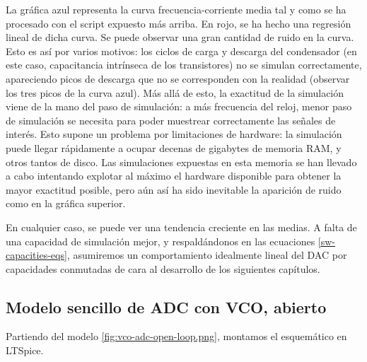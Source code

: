\documentclass[12pt]{report} %
\begin{document}
	La gráfica azul representa la curva frecuencia-corriente media tal y como se ha procesado con el script expuesto más arriba. En rojo, se ha hecho una regresión lineal de dicha curva. Se puede observar una gran cantidad de ruido en la curva. Esto es así por varios motivos: los ciclos de carga y descarga del condensador (en este caso, capacitancia intrínseca de los transistores) no se simulan correctamente, apareciendo picos de descarga que no se corresponden con la realidad (observar los tres picos de la curva azul). Más allá de esto, la exactitud de la simulación viene de la mano del paso de simulación: a más frecuencia del reloj, menor paso de simulación se necesita para poder muestrear correctamente las señales de interés. Esto supone un problema por limitaciones de hardware: la simulación puede llegar rápidamente a ocupar decenas de gigabytes de memoria RAM, y otros tantos de disco. Las simulaciones expuestas en esta memoria se han llevado a cabo intentando explotar al máximo el hardware disponible para obtener la mayor exactitud posible, pero aún así ha sido inevitable la aparición de ruido como en la gráfica superior.
	
	En cualquier caso, se puede ver una tendencia creciente en las medias. A falta de una capacidad de simulación mejor, y respaldándonos en las ecuaciones \ref{sw-capacities-eqs}, asumiremos un comportamiento idealmente lineal del DAC por capacidades conmutadas de cara al desarrollo de los siguientes capítulos.
	
	\subsection{Modelo sencillo de ADC con VCO, abierto}
	
	Partiendo del modelo \ref{fig:vco-adc-open-loop.png}, montamos el esquemático en LTSpice.
	
\end{document}
